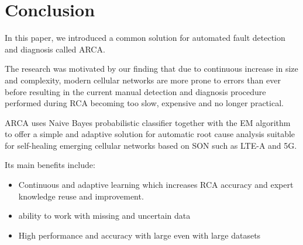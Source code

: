 \documentclass[conference]{IEEEtran}
\begin{document}
 
\section{Conclusion}
\label{sec:conclusion}
In this paper, we introduced a common solution for automated fault detection and diagnosis called ARCA. 

The research was motivated by our finding that due to continuous increase in size and complexity, modern cellular networks are more prone to errors than ever before resulting in the current  manual detection and diagnosis procedure performed during  RCA becoming too slow, expensive and no longer practical. 

ARCA uses Naive Bayes probabilistic classifier together with the EM algorithm to offer a simple and adaptive solution for automatic root cause analysis suitable for self-healing emerging cellular networks based on SON such as LTE-A and 5G.

Its main benefits include:
\begin{itemize}
\item Continuous and adaptive learning which increases RCA accuracy and expert knowledge reuse and improvement.
\item ability to work with missing and uncertain data
\item High performance and accuracy with large even with large datasets
\end{itemize}






\end{document}
